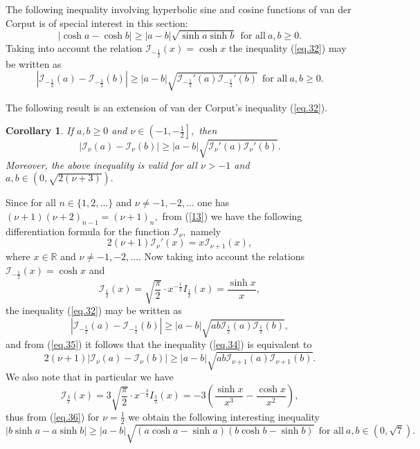 \documentclass[10pt]{amsart}
\newtheorem{corollary}{Corollary}
\begin{document}
The following inequality involving hyperbolic sine and
cosine functions of van der Corput \cite[p. 270]{mi} is of special
interest in this section: \begin{equation}\label{eq.32}|\cosh a
-\cosh b|\geq |a-b|\sqrt{\sinh a \sinh b}\ \ \mbox{for all}\
a,b\geq 0.\end{equation} Taking into account the relation
$\mathcal{I}_{-\frac{1}{2}}(x)=\cosh x$ the inequality (\ref{eq.32}) may
be written as
$$|\mathcal{I}_{-\frac{1}{2}}(a)-\mathcal{I}_{-\frac{1}{2}}(b)|\geq
|a-b|\sqrt{\mathcal{I}_{-\frac{1}{2}}'(a)\mathcal{I}_{-\frac{1}{2}}'(b)}\ \
\mbox{for all}\ a,b\geq 0.$$

The following result is an extension of van der Corput's
inequality (\ref{eq.32}).

\begin{corollary}\label{th2}
If $a,b\geq0$ and $\nu\in\left(-1,-\frac{1}{2}\right],$ then
\begin{equation}\label{eq.34}|\mathcal{I}_{\nu}(a)-\mathcal{I}_{\nu}(b)|\geq
|a-b|\sqrt{\mathcal{I}_{\nu}'(a)\mathcal{I}_{\nu}'(b)}.\end{equation}
Moreover, the above inequality is valid for all $\nu>-1$ and $a,b\in\left(0,\sqrt{2(\nu+3)}\right).$
\end{corollary}

Since for all $n\in\{1,2,\dots\}$ and $\nu\neq -1,-2,\dots$ one has
$(\nu+1){(\nu+2)}_{n-1}={(\nu+1)}_n,$ from (\ref{13}) we have the
following differentiation formula for the function
$\mathcal{I}_{\nu},$ namely
\begin{equation}\label{eq.35}
2(\nu+1)\mathcal{I}_{\nu}'(x)=x\mathcal{I}_{\nu+1}(x),
\end{equation}
where $x\in\mathbb{R}$ and $\nu\neq -1,-2,{\dots}.$ Now taking into
account the relations $\mathcal{I}_{-\frac{1}{2}}(x)=\cosh x$ and
$$\mathcal{I}_{\frac{1}{2}}(x)=\sqrt{\frac{\pi}{2}}\cdot x^{-\frac{1}{2}}I_{\frac{1}{2}}(x)=\frac{\sinh
x}{x},$$ the inequality (\ref{eq.32}) may be written as
$$|\mathcal{I}_{-\frac{1}{2}}(a)-\mathcal{I}_{-\frac{1}{2}}(b)|\geq
|a-b|\sqrt{ab\mathcal{I}_{\frac{1}{2}}(a)\mathcal{I}_{\frac{1}{2}}(b)},$$ and from
(\ref{eq.35}) it follows that the inequality (\ref{eq.34}) is
equivalent to
\begin{equation}\label{eq.36}2(\nu+1)|\mathcal{I}_{\nu}(a)-\mathcal{I}_{\nu}(b)|\geq
|a-b|\sqrt{ab\mathcal{I}_{\nu+1}(a)\mathcal{I}_{\nu+1}(b)}.\end{equation}
We also note that in particular we have
$$\mathcal{I}_{\frac{3}{2}}(x)=3\sqrt{\frac{\pi}{2}}\cdot
x^{-\frac{3}{2}}I_{\frac{3}{2}}(x)=-3\left(\frac{\sinh x}{x^3}-\frac{\cosh
x}{x^2}\right),$$ thus from (\ref{eq.36}) for $\nu=\frac{1}{2}$ we obtain
the following interesting inequality
$$
|b\sinh a-a\sinh b|\geq |a-b|\sqrt{(a\cosh a-\sinh a)(b\cosh
b-\sinh b)} \ \ \mbox{for all}\
a,b\in\left(0,\sqrt{7}\right).
$$
\end{document}
